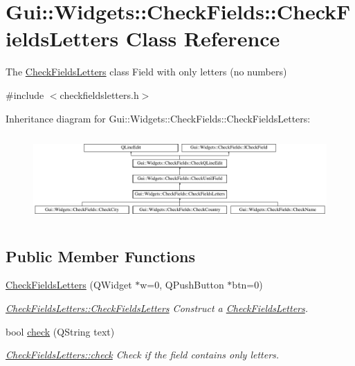 \hypertarget{classGui_1_1Widgets_1_1CheckFields_1_1CheckFieldsLetters}{\section{Gui\-:\-:Widgets\-:\-:Check\-Fields\-:\-:Check\-Fields\-Letters Class Reference}
\label{classGui_1_1Widgets_1_1CheckFields_1_1CheckFieldsLetters}
}


The \hyperlink{classGui_1_1Widgets_1_1CheckFields_1_1CheckFieldsLetters}{Check\-Fields\-Letters} class Field with only letters (no numbers)  




{\ttfamily \#include $<$checkfieldsletters.\-h$>$}

Inheritance diagram for Gui\-:\-:Widgets\-:\-:Check\-Fields\-:\-:Check\-Fields\-Letters\-:\begin{figure}[H]
\begin{center}
\leavevmode
\includegraphics[height=3.345281cm]{df/dba/classGui_1_1Widgets_1_1CheckFields_1_1CheckFieldsLetters}
\end{center}
\end{figure}
\subsection*{Public Member Functions}
\begin{DoxyCompactItemize}
\item 
\hyperlink{classGui_1_1Widgets_1_1CheckFields_1_1CheckFieldsLetters_a2026c54051fdadca10860d0eaaa4b243}{Check\-Fields\-Letters} (Q\-Widget $\ast$w=0, Q\-Push\-Button $\ast$btn=0)
\begin{DoxyCompactList}\small\item\em \hyperlink{classGui_1_1Widgets_1_1CheckFields_1_1CheckFieldsLetters_a2026c54051fdadca10860d0eaaa4b243}{Check\-Fields\-Letters\-::\-Check\-Fields\-Letters} Construct a \hyperlink{classGui_1_1Widgets_1_1CheckFields_1_1CheckFieldsLetters}{Check\-Fields\-Letters}. \end{DoxyCompactList}\item 
bool \hyperlink{classGui_1_1Widgets_1_1CheckFields_1_1CheckFieldsLetters_a95f6808ecc2cedf22407fc1791827851}{check} (Q\-String text)
\begin{DoxyCompactList}\small\item\em \hyperlink{classGui_1_1Widgets_1_1CheckFields_1_1CheckFieldsLetters_a95f6808ecc2cedf22407fc1791827851}{Check\-Fields\-Letters\-::check} Check if the field contains only letters. \end{DoxyCompactList}\end{DoxyCompactItemize}
